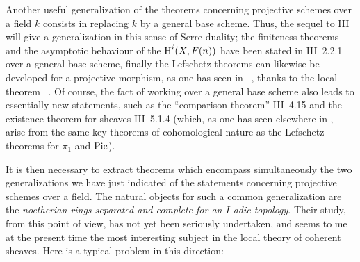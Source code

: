 Another useful generalization of the theorems concerning projective schemes over a field $k$ consists in replacing $k$ by a general base scheme. Thus, the sequel to {\EGA III} will give a generalization in this sense of Serre duality; the finiteness theorems and the asymptotic behaviour of the $\operatorname{H}^i(X, F(n))$ have been stated in \EGA III~2.2.1 over a general base scheme, finally the Lefschetz theorems can likewise be developed for a projective morphism, as one has seen in ~, thanks to the local theorem ~. Of course, the fact of working over a general base scheme also leads to essentially new statements, such as the ``comparison theorem'' \EGA III~4.15 and the existence theorem for sheaves \EGA III~5.1.4 (which, as one has seen elsewhere in , arise from the same key theorems of cohomological nature as the Lefschetz theorems for $\pi_1$ and $\operatorname{Pic}$).

It is then necessary to extract theorems which encompass simultaneously the two generalizations we have just indicated of the statements concerning projective schemes over a field. The natural objects for such a common generalization are the \emph{noetherian rings separated and complete for an $I$-adic topology}. Their study, from this point of view, has not yet been seriously undertaken, and seems to me at the present time the most interesting subject in the local theory of coherent sheaves. Here is a typical problem in this direction:

